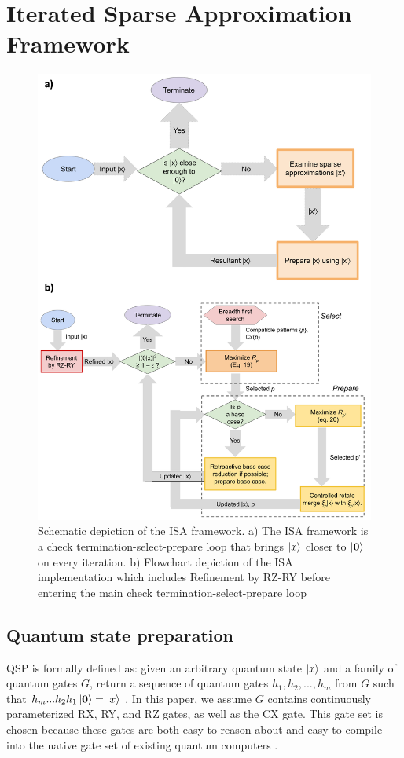 \section{Iterated Sparse Approximation Framework}

\begin{figure}[h]
\centering
\includegraphics[width=0.8\linewidth]{main/figs/mfig_1.png}
\caption{Schematic depiction of the ISA framework. a) The ISA framework is a
check termination-select-prepare loop that brings $\mathinner{|{x}\rangle}$ closer to $\mathinner{|{\mathbf{0}}\rangle}$
on every iteration. b)  Flowchart depiction of the ISA implementation which includes Refinement by RZ-RY before entering the
main check termination-select-prepare loop}
\label{mfig1}
\end{figure}

\subsection{Quantum state preparation}
QSP is formally defined as: given an arbitrary quantum state $\mathinner{|{x}\rangle}$ and a
family of quantum gates $G$, return a sequence of quantum gates 
$h_1, h_2, ... , h_m$ from $G$ such that $h_m ... h_2h_1\mathinner{|{\mathbf{0}}\rangle} = \mathinner{|{x}\rangle}$
\cite{1629135}. In this paper, we assume $G$ contains continuously parameterized 
RX, RY, and RZ gates, as well as the CX gate. This gate set is chosen because 
these gates are both easy to reason about and easy to compile into the native 
gate set of existing quantum computers \cite{maldonado2022error}. 

